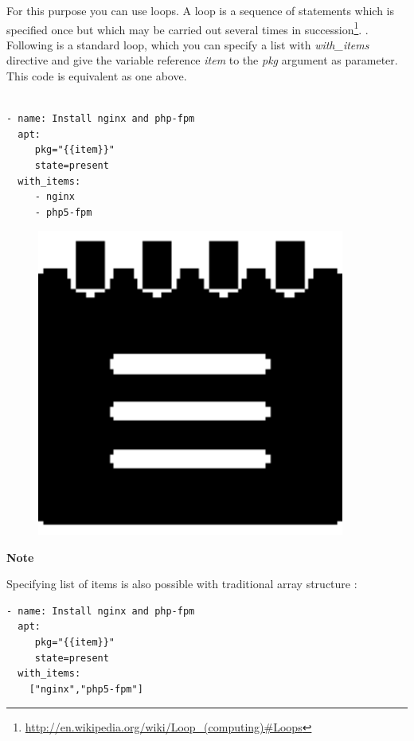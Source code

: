 \documentclass[10pt]{book}
\begin{document}
For this purpose you can use loops. A loop is a sequence of statements which is specified 
once but which may be carried out several times in succession\footnote {\url{http://en.wikipedia.org/wiki/Loop_(computing)\#Loops}}. .
Following is a standard loop, which you can specify a list with \emph{with\_items} directive 
and give the variable reference \emph{item} to the \emph{pkg} argument as 
parameter. This code is equivalent as one above.

\begin{Verbatim} 

- name: Install nginx and php-fpm 
  apt: 
     pkg="{{item}}" 
     state=present
  with_items:
     - nginx
     - php5-fpm

\end{Verbatim}

\begin{mdframed}[style=noteStyle]
\begin{minipage}[b]{0.05\textwidth}
\begin{figure}[H]
\includegraphics[width=0.9\textwidth]{figures/notes-icon.eps} 
\end{figure}
\end{minipage}  
\begin{minipage}[b]{0.05\textwidth}
\textbf{Note}
\end{minipage}

Specifying list of items is also possible with traditional array structure :

\begin{Verbatim} 
- name: Install nginx and php-fpm 
  apt: 
     pkg="{{item}}" 
     state=present
  with_items: 
    ["nginx","php5-fpm"]
\end{Verbatim}

\end{mdframed}
 
\end{document}
